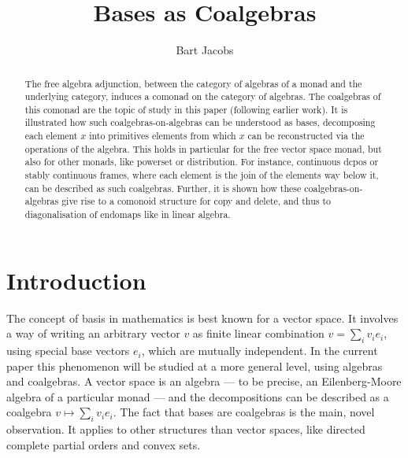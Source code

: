 \documentclass{LMCS}
\begin{document}
\title{Bases as Coalgebras}
\author[B. Jacobs]{Bart Jacobs}

\address{Institute for Computing and Information Sciences (iCIS), 
Radboud University Nijmegen, The Netherlands.} 




\begin{abstract}
The free algebra adjunction, between the category of algebras of a
monad and the underlying category, induces a comonad on the category
of algebras. The coalgebras of this comonad are the topic of study in
this paper (following earlier work).  It is illustrated how such
coalgebras-on-algebras can be understood as bases, decomposing each
element $x$ into primitives elements from which $x$ can be
reconstructed via the operations of the algebra. This holds in
particular for the free vector space monad, but also for other monads,
like powerset or distribution. For instance, continuous dcpos or
stably continuous frames, where each element is the join of the
elements way below it, can be described as such coalgebras. Further,
it is shown how these coalgebras-on-algebras give rise to a comonoid
structure for copy and delete, and thus to diagonalisation of endomaps
like in linear algebra.
\end{abstract}



\maketitle


\section{Introduction}\label{IntroSec}

The concept of basis in mathematics is best known for a vector space.
It involves a way of writing an arbitrary vector $v$ as finite linear
combination $v = \sum_{i} v_{i}e_{i}$, using special base vectors
$e_i$, which are mutually independent. In the current paper this
phenomenon will be studied at a more general level, using algebras and
coalgebras.  A vector space is an algebra --- to be precise, an
Eilenberg-Moore algebra of a particular monad --- and the
decompositions can be described as a coalgebra $v \mapsto \sum_{i}
v_{i}e_{i}$. The fact that bases are coalgebras is the main, novel
observation. It applies to other structures than vector spaces, like
directed complete partial orders and convex sets.
\end{document}
